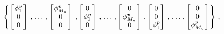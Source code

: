 \documentclass[12pt, a4paper, twoside, openright]{report}
\numberwithin{equation}{chapter}
\theoremstyle{theorem}
\theoremstyle{definition}
\theoremstyle{remark}
\theoremstyle{proposition}
\numberwithin{figure}{chapter}
\newcommand{\bg}[1]{\boldsymbol{#1}}
\begin{document}
		\begin{equation*}
			\left\{ 
			\begin{bmatrix}
			\hspace*{-0.15cm}
			\begin{array}{c}
				\phi_1^{\bg{v}} \\ 
				0 \\ 
				0 
			\end{array} 
			\hspace*{-0.15cm}
			\end{bmatrix}
			\, , \, \ldots \, , 
			\begin{bmatrix}
			\hspace*{-0.15cm}
			\begin{array}{c}
				\phi_{M_n}^{\bg{v}} \\ 
				0 \\ 
				0 
			\end{array} 
			\hspace*{-0.15cm}
			\end{bmatrix}
			\, ,
			\begin{bmatrix}
			\hspace*{-0.15cm}
			\begin{array}{c}
				0 \\ 
				\phi_1^{\bg{v}} \\ 
				0 
			\end{array} 
			\hspace*{-0.15cm}
			\end{bmatrix}
			\, , \, \ldots \, ,
			\begin{bmatrix}
			\hspace*{-0.15cm}
			\begin{array}{c}
				0 \\ 
				\phi_{M_n}^{\bg{v}} \\ 
				0 
			\end{array} 
			\hspace*{-0.15cm}
			\end{bmatrix}
			\, ,
			\begin{bmatrix}
			\hspace*{-0.15cm}
			\begin{array}{c}
				0 \\ 
				0 \\ 
				\phi_1^{p} 
			\end{array} 
			\hspace*{-0.15cm}
			\end{bmatrix}
			\, , \, \ldots \, ,
			\begin{bmatrix}
			\hspace*{-0.15cm}
			\begin{array}{c}
				0 \\ 
				0 \\ 
				\phi_{M_v}^{p} 
			\end{array} 
			\hspace*{-0.15cm}
			\end{bmatrix}
			\right\} \, ,
		\end{equation*}
\end{document}
